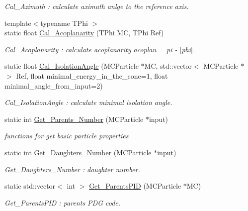 \begin{DoxyCompactItemize}
\begin{DoxyCompactList}\small\item\em Cal\_\-Azimuth : calculate aximuth anlge to the reference axis. \item\end{DoxyCompactList}\item 
{\footnotesize template$<$typename TPhi $>$ }\\static float \hyperlink{classToolSet_1_1CMC_aa1667ca515e4b26ca43755fd8d2e30bd}{Cal\_\-Acoplanarity} (TPhi MC, TPhi Ref)
\begin{DoxyCompactList}\small\item\em Cal\_\-Acoplanarity : calculate acoplanarity acoplan = pi -\/ $|$phi$|$. \item\end{DoxyCompactList}\item 
static float \hyperlink{classToolSet_1_1CMC_a3d0ff5af967b32efbc5907174b64348f}{Cal\_\-IsolationAngle} (MCParticle $\ast$MC, std::vector$<$ MCParticle $\ast$ $>$ Ref, float minimal\_\-energy\_\-in\_\-the\_\-cone=1, float minimal\_\-angle\_\-from\_\-input=2)
\begin{DoxyCompactList}\small\item\em Cal\_\-IsolationAngle : calculate minimal isolation angle. \item\end{DoxyCompactList}\item 
static int \hyperlink{classToolSet_1_1CMC_a67ab1d51b7fd0f98cfa19be5381e961a}{Get\_\-Parents\_\-Number} (MCParticle $\ast$input)
\begin{DoxyCompactList}\small\item\em functions for get basic particle properties \item\end{DoxyCompactList}\item 
static int \hyperlink{classToolSet_1_1CMC_a44a3b5e5df7effa4ed170151cd63b706}{Get\_\-Daughters\_\-Number} (MCParticle $\ast$input)
\begin{DoxyCompactList}\small\item\em Get\_\-Daughters\_\-Number : daughter number. \item\end{DoxyCompactList}\item 
static std::vector$<$ int $>$ \hyperlink{classToolSet_1_1CMC_aa98186321fc75d5f476bc97511e1d91b}{Get\_\-ParentsPID} (MCParticle $\ast$MC)
\begin{DoxyCompactList}\small\item\em Get\_\-ParentsPID : parents PDG code. \item\end{DoxyCompactList}\item 

\end{DoxyCompactItemize}
